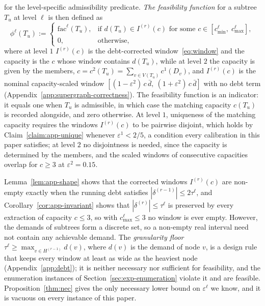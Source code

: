 \documentclass[preprint,12pt,authoryear]{elsarticle}
\theoremstyle{definition}
\begin{document}
%
for the level-specific admissibility predicate. \emph{The feasibility function} for a subtree $T_u$ at level $\ell$ is then defined as
%
\begin{equation}\label{eq:feasible-phi}
    \phi^\ell(T_u) := \begin{cases}
        \text{fac}^\ell(T_u), &
        \text{if } d(T_u) \in  I^{(r)}(c)
        \text{ for some } c \in [c_{\min}^{\ell},\; c_{\max}^{\ell}], \\[3pt]
        0, & \text{otherwise},
    \end{cases}
\end{equation}
where at level $1$ $I^{(r)}(c)$ is the debt-corrected window~\eqref{eq:window} and the capacity is the $c$ whose window contains $d(T_u)$, while at level $2$ the capacity is given by the members, $c = c^2(T_u) = \sum_{v \in V(T_u)} c^1(D_v)$, and $I^{(r)}(c)$ is the nominal capacity-scaled window $[(1-\varepsilon^2)\,c\,\bar d,\ (1+\varepsilon^2)\,c\,\bar d]$ with no debt term (Appendix~\ref{app:supergraph-correctness}). The feasibility function is an indicator: it equals one when $T_u$ is admissible, in which case the matching capacity $c(T_u)$ is recorded alongside, and zero otherwise. At level $1$, uniqueness of the matching capacity requires the windows $I^{(r)}(c)$ to be pairwise disjoint, which holds by Claim~\ref{claim:app-unique} whenever $\varepsilon^{1} < 2/5$, a condition every calibration in this paper satisfies; at level $2$ no disjointness is needed, since the capacity is determined by the members, and the scaled windows of consecutive capacities overlap for $c \geq 3$ at $\varepsilon^2 = 0.15$.

Lemma~\ref{lem:app-shape} shows that the corrected windows $I^{(r)}(c)$ are non-empty exactly when the running debt satisfies $|\delta^{(r-1)}| \leq 2\tau^{\ell}$, and Corollary~\ref{cor:app-invariant} shows that $|\delta^{(r)}| \leq \tau^{\ell}$ is preserved by every extraction of capacity $c \leq 3$, so with $c^{\ell}_{\max} \leq 3$ no window is ever empty. However, the demands of subtrees form a discrete set, so a non-empty real interval need not contain any achievable demand. The \emph{granularity floor} $\tau^{\ell} \geq \max_{v \in H^{(r-1)}} d(v)$, where $d(v)$ is the demand of node $v$, is a design rule that keeps every window at least as wide as the heaviest node (Appendix~\ref{app:debt}); it is neither necessary nor sufficient for feasibility, and the enumeration instances of Section~\ref{sec:exp-enumeration} violate it and are feasible. Proposition~\ref{thm:nec} gives the only necessary lower bound on $\varepsilon^\ell$ we know, and it is vacuous on every instance of this paper.
\end{document}
